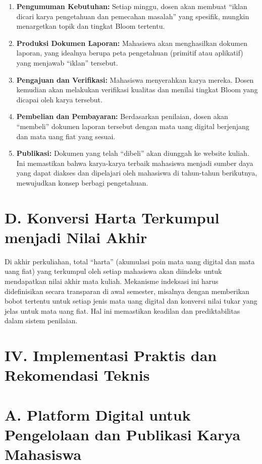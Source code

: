 \documentclass[
  letterpaper,
  DIV=11,
  numbers=noendperiod]{scrreprt}
\begin{document}
\begin{enumerate}
\def\labelenumi{\arabic{enumi}.}
\item
  \textbf{Pengumuman Kebutuhan:} Setiap minggu, dosen akan membuat
  ``iklan dicari karya pengetahuan dan pemecahan masalah'' yang
  spesifik, mungkin menargetkan topik dan tingkat Bloom tertentu.
\item
  \textbf{Produksi Dokumen Laporan:} Mahasiswa akan menghasilkan dokumen
  laporan, yang idealnya berupa peta pengetahuan (primitif atau
  aplikatif) yang menjawab ``iklan'' tersebut.
\item
  \textbf{Pengajuan dan Verifikasi:} Mahasiswa menyerahkan karya mereka.
  Dosen kemudian akan melakukan verifikasi kualitas dan menilai tingkat
  Bloom yang dicapai oleh karya tersebut.
\item
  \textbf{Pembelian dan Pembayaran:} Berdasarkan penilaian, dosen akan
  ``membeli'' dokumen laporan tersebut dengan mata uang digital
  berjenjang dan mata uang fiat yang sesuai.
\item
  \textbf{Publikasi:} Dokumen yang telah ``dibeli'' akan diunggah ke
  website kuliah. Ini memastikan bahwa karya-karya terbaik mahasiswa
  menjadi sumber daya yang dapat diakses dan dipelajari oleh mahasiswa
  di tahun-tahun berikutnya, mewujudkan konsep berbagi pengetahuan.
\end{enumerate}

\section{D. Konversi Harta Terkumpul menjadi Nilai
Akhir}\label{d.-konversi-harta-terkumpul-menjadi-nilai-akhir}

Di akhir perkuliahan, total ``harta'' (akumulasi poin mata uang digital
dan mata uang fiat) yang terkumpul oleh setiap mahasiswa akan diindeks
untuk mendapatkan nilai akhir mata kuliah. Mekanisme indeksasi ini harus
didefinisikan secara transparan di awal semester, misalnya dengan
memberikan bobot tertentu untuk setiap jenis mata uang digital dan
konversi nilai tukar yang jelas untuk mata uang fiat. Hal ini memastikan
keadilan dan prediktabilitas dalam sistem penilaian.

\section{IV. Implementasi Praktis dan Rekomendasi
Teknis}\label{iv.-implementasi-praktis-dan-rekomendasi-teknis}

\section{A. Platform Digital untuk Pengelolaan dan Publikasi Karya
Mahasiswa}\label{a.-platform-digital-untuk-pengelolaan-dan-publikasi-karya-mahasiswa}
\end{document}
